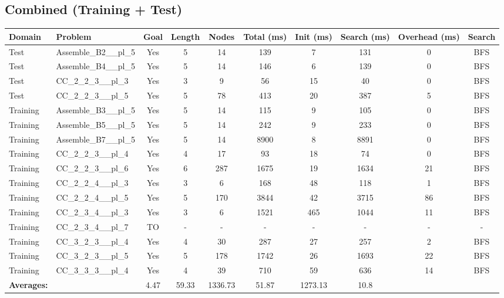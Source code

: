 \documentclass{article}
\begin{document}
\subsection*{Combined (Training + Test)}
\begin{tabular}{llcccccccc}
\toprule
Domain & Problem & Goal & Length & Nodes & Total (ms) & Init (ms) & Search (ms) & Overhead (ms) & Search \\
\midrule
Test & Assemble\_B2\_\_pl\_5 & Yes & 5 & 14 & 139 & 7 & 131 & 0 & BFS \\
Test & Assemble\_B4\_\_pl\_5 & Yes & 5 & 14 & 146 & 6 & 139 & 0 & BFS \\
Test & CC\_2\_2\_3\_\_pl\_3 & Yes & 3 & 9 & 56 & 15 & 40 & 0 & BFS \\
Test & CC\_2\_2\_3\_\_pl\_5 & Yes & 5 & 78 & 413 & 20 & 387 & 5 & BFS \\
Training & Assemble\_B3\_\_pl\_5 & Yes & 5 & 14 & 115 & 9 & 105 & 0 & BFS \\
Training & Assemble\_B5\_\_pl\_5 & Yes & 5 & 14 & 242 & 9 & 233 & 0 & BFS \\
Training & Assemble\_B7\_\_pl\_5 & Yes & 5 & 14 & 8900 & 8 & 8891 & 0 & BFS \\
Training & CC\_2\_2\_3\_\_pl\_4 & Yes & 4 & 17 & 93 & 18 & 74 & 0 & BFS \\
Training & CC\_2\_2\_3\_\_pl\_6 & Yes & 6 & 287 & 1675 & 19 & 1634 & 21 & BFS \\
Training & CC\_2\_2\_4\_\_pl\_3 & Yes & 3 & 6 & 168 & 48 & 118 & 1 & BFS \\
Training & CC\_2\_2\_4\_\_pl\_5 & Yes & 5 & 170 & 3844 & 42 & 3715 & 86 & BFS \\
Training & CC\_2\_3\_4\_\_pl\_3 & Yes & 3 & 6 & 1521 & 465 & 1044 & 11 & BFS \\
Training & CC\_2\_3\_4\_\_pl\_7 & TO & - & - & - & - & - & - & - \\
Training & CC\_3\_2\_3\_\_pl\_4 & Yes & 4 & 30 & 287 & 27 & 257 & 2 & BFS \\
Training & CC\_3\_2\_3\_\_pl\_5 & Yes & 5 & 178 & 1742 & 26 & 1693 & 22 & BFS \\
Training & CC\_3\_3\_3\_\_pl\_4 & Yes & 4 & 39 & 710 & 59 & 636 & 14 & BFS \\
\textbf{Averages:} & & 4.47 & 59.33 & 1336.73 & 51.87 & 1273.13 & 10.8 & \\
\bottomrule
\end{tabular}
\\[0.7cm]
\end{document}
